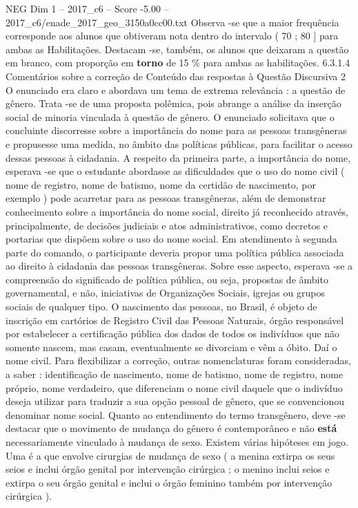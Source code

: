 \begin{textsample}{NEG Dim 1 – 2017\_c6 – Score -5.00 – 2017\_c6/enade\_2017\_geo\_3150a0cc00.txt}
Observa -se que a maior frequência corresponde aos alunos que obtiveram nota dentro do intervalo ( 70 ; 80 ] para ambas as Habilitações.
Destacam -se, também, os alunos que deixaram a questão em branco, com proporção em \textbf{torno} de 15 \% para ambas as habilitações. 6.3.1.4 Comentários sobre a correção de Conteúdo das respostas à Questão Discursiva 2 O enunciado era claro e abordava um tema de extrema relevância : a questão de gênero.
Trata -se de uma proposta polêmica, pois abrange a análise da inserção social de minoria vinculada à questão de gênero.
O enunciado solicitava que o concluinte discorresse sobre a importância do nome para as pessoas transgêneras e propusesse uma medida, no âmbito das políticas públicas, para facilitar o acesso dessas pessoas à cidadania.
A respeito da primeira parte, a importância do nome, esperava -se que o estudante abordasse as dificuldades que o uso do nome civil ( nome de registro, nome de batismo, nome da certidão de nascimento, por exemplo ) pode acarretar para as pessoas transgêneras, além de demonstrar conhecimento sobre a importância do nome social, direito já reconhecido através, principalmente, de decisões judiciais e atos administrativos, como decretos e portarias que dispõem sobre o uso do nome social.
Em atendimento à segunda parte do comando, o participante deveria propor uma política pública associada ao direito à cidadania das pessoas transgêneras.
Sobre esse aspecto, esperava -se a compreensão do significado de política pública, ou seja, propostas de âmbito governamental, e não, iniciativas de Organizações Sociais, igrejas ou grupos sociais de qualquer tipo.
O nascimento das pessoas, no Brasil, é objeto de inscrição em cartórios de Registro Civil das Pessoas Naturais, órgão responsável por estabelecer a certificação pública dos dados de todos os indivíduos que não somente nascem, mas casam, eventualmente se divorciam e vêm a óbito.
Daí o nome civil.
Para flexibilizar a correção, outras nomenclaturas foram consideradas, a saber : identificação de nascimento, nome de batismo, nome de registro, nome próprio, nome verdadeiro, que diferenciam o nome civil daquele que o indivíduo deseja utilizar para traduzir a sua opção pessoal de gênero, que se convencionou denominar nome social.
Quanto ao entendimento do termo transgênero, deve -se destacar que o movimento de mudança do gênero é contemporâneo e não \textbf{está} necessariamente vinculado à mudança de sexo.
Existem várias hipóteses em jogo.
Uma é a que envolve cirurgias de mudança de sexo ( a menina extirpa os seus seios e inclui órgão genital por intervenção cirúrgica ; o menino inclui seios e extirpa o seu órgão genital e inclui o órgão feminino também por intervenção cirúrgica ).

\end{textsample}
